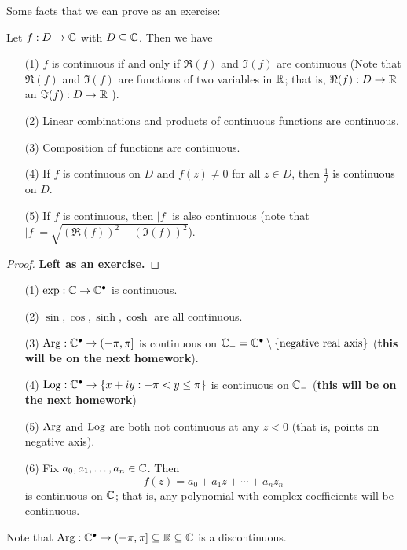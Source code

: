 \documentclass[a4paper]{report}
\begin{document}
Some facts that we can prove as an exercise:

\begin{lemma}
Let \( f: D \to \mathbb{C}  \) with \( D \subseteq \mathbb{C} \). Then we have
\begin{enumerate}
    \item[(1)] \( f  \) is continuous if and only if \( \Re(f) \) and \( \Im(f) \) are continuous (Note that \( \Re(f) \) and \( \Im(f) \) are functions of two variables in \( \mathbb{R}  \); that is, \( \Re(f) : D \to \mathbb{R}  \) an \( \Im(f) : D \to \mathbb{R}  \) ).
    \item[(2)] Linear combinations and products of continuous functions are continuous.
    \item[(3)] Composition of functions are continuous. 
    \item[(4)] If \( f  \) is continuous on \( D  \) and \( f(z) \neq 0  \) for all \( z \in D  \), then \( \frac{ 1 }{ f }  \) is continuous on \( D  \).
    \item[(5)] If \( f  \) is continuous, then \( | f |   \) is also continuous (note that \( | f |  = \sqrt{ (\Re(f))^{2} + (\Im(f))^{2} }  \)).
\end{enumerate}
\end{lemma}
\begin{proof}
\textbf{Left as an exercise.}
\end{proof}

\begin{eg}
    \begin{enumerate}
        \item[(1)] \( \exp: \mathbb{C} \to \mathbb{C}^{\bullet} \) is continuous.
        \item[(2)] \( \sin, \cos, \sinh, \cosh \) are all continuous.
        \item[(3)] \( \operatorname{Arg}: \mathbb{C}^{\bullet} \to (-\pi, \pi] \) is continuous on \( \mathbb{C}_{-} = \mathbb{C}^{\bullet} \setminus  \{ \text{negative real axis} \}  \) (\textbf{this will be on the next homework}).
        \item[(4)] \( \operatorname{Log}: \mathbb{C}^{\bullet} \to \{ x + iy: -\pi < y \leq \pi  \}  \) is continuous on \( \mathbb{C}_{-} \) (\textbf{this will be on the next homework})
        \item[(5)] \( \operatorname{Arg}  \) and \( \operatorname{Log}  \) are both not continuous at any \( z < 0  \) (that is, points on negative axis).
        \item[(6)] Fix \( {a}_{0}, {a}_{1}, \dots, {a}_{n} \in \mathbb{C}  \). Then
            \[  f(z) = {a}_{0} + {a}_{1} z + \cdots + {a}_{n} {z}_{n} \]
            is continuous on \( \mathbb{C}  \); that is, any polynomial with complex coefficients will be continuous.
    \end{enumerate}
\end{eg}

Note that \( \operatorname{Arg}: \mathbb{C}^{\bullet} \to (-\pi, \pi] \subseteq  \mathbb{R} \subseteq \mathbb{C}  \) is a discontinuous.
\end{document}
